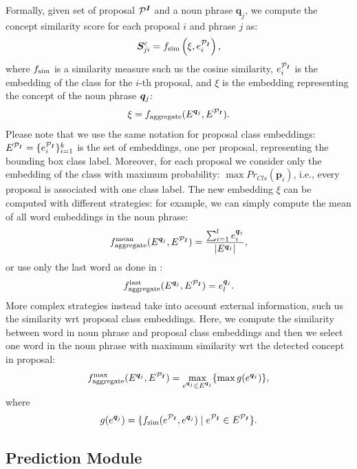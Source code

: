 Formally, given set of proposal $\mathcal{P}^{\bm{I}}$ and a noun phrase
$\bm{q}_j$, we compute the concept similarity score for each proposal
$i$ and phrase $j$ as:
\begin{equation}
  \bm{S}^c_{ji} = f_{\text{sim}} \left( \xi, e^{\mathcal{P}_{\bm{I}}}_i \right),
\end{equation}
where $f_{\text{sim}}$ is a similarity measure such us the cosine similarity,
$e^{\mathcal{P}_{\bm{I}}}_i$ is the embedding of the class for the $i$-th proposal, and
$\xi$ is the embedding representing the concept of the noun phrase
$\bm{q}_j$:
\begin{equation}
  \xi = f_{\text{aggregate}}(E^{\bm{q}_j}, E^{\mathcal{P}_{\bm{I}}}).
\end{equation}
Please note that we use the same notation for proposal class
embeddings: $E^{\mathcal{P}_{\bm{I}}} = \{ e^{\mathcal{P}_{\bm{I}}}_i \}^{k}_{i=1}$ is the set of embeddings,
one per proposal, representing the bounding box class label. Moreover,
for each proposal we consider only the embedding of the class with
maximum probability: $\max Pr_{Cls} (\bm{p}_i)$, i.e., every proposal
is associated with one class label.  The new embedding $\xi$ can be computed with different
strategies: for example, we can simply compute the mean of all word
embeddings in the noun phrase:
\begin{equation}
  f_{\text{aggregate}}^{\text{mean}}(E^{\bm{q}_j}, E^{\mathcal{P}_{\bm{I}}}) = \frac{\sum^l_{i=1} e^{\bm{q}_j}_i}{| E^{\bm{q}_j} |},
\end{equation}
or use only the last word as done in :
\begin{equation}
  f_{\text{aggregate}}^{\text{last}}(E^{\bm{q}_j}, E^{\mathcal{P}_{\bm{I}}}) = e^{\bm{q}_j}_l.
\end{equation}
More complex strategies instead take into account external
information, such us the similarity wrt proposal class embeddings.
Here, we compute the similarity between word in noun phrase and
proposal class embeddings and then we select one word in the noun
phrase with maximum similarity wrt the detected concept in proposal:
\begin{equation}
  f_{\text{aggregate}}^{\text{max}}(E^{\bm{q}_j}, E^{\mathcal{P}_{\bm{I}}}) = \max_{e^{\bm{q}_j} \in E^{\bm{q}_j}} \{ \max g(e^{\bm{q}_j}) \},
\end{equation}
where
\begin{equation}
  g(e^{\bm{q}_j}) = \{ f_{\text{sim}}(e^{\mathcal{P}_{\bm{I}}}, e^{\bm{q}_j}) \mid e^{\mathcal{P}_{\bm{I}}} \in E^{\mathcal{P}_{\bm{I}}} \}.
\end{equation}

\subsection{Prediction Module}

